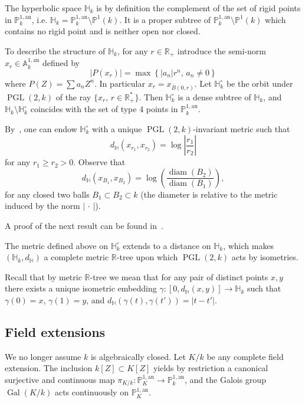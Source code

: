\documentclass[AHL,Unicode,longabstracts]{cedram}
\DeclareMathOperator{\Gal}{Gal}
\DeclareMathOperator{\diam}{diam}
\DeclareMathOperator{\PGL}{PGL}
\newcommand{\hh}{\mathbb{H}}
\newcommand{\A}{{\mathbb A}}
\newcommand{\R}{{\mathbb R}}
\newcommand{\an}{\mathrm{an}}
\newcommand{\PP}{\mathbb{P}}
\newcommand{\PGLk}{\PGL(2, k)}
\begin{document}
The hyperbolic space $\hh_k$ is by definition the complement of the set of rigid points in $\PP^{1,\an}_k$, i.e. $\hh_k = \PP^{1,\an}_k \setminus \PP^{1}(k)$. It is a proper subtree of $\PP^{1,\an}_k \setminus \PP^1(k)$ which contains no rigid point and is neither open nor closed.

To describe the structure of $\hh_k$, for any $r\in \R_+$ introduce the semi-norm $x_r\in \A^{1,\an}_k$ defined by
\[
|P(x_r)| = \max \left\{ |a_n| r^n, \, a_n \neq 0 \right\}
\]
where $P(Z) = \sum a_n Z^n$. In particular $x_r = x_{\bar B(0,r)}$. Let $\hh_k^\circ$ be the orbit under $\PGL(2,k)$ of the ray $\{ x_r, \, r\in \R_+^*\}$. Then $\hh_k^\circ$ is a dense subtree of $\hh_k$, and $\hh_k \setminus \hh_k^\circ$ coincides with the set of type 4 points in $\PP^{1,\an}_k$.

By~\cite[Prop.~2.30]{baker-rumely}, one can endow $\hh_k^\circ$ with a unique $\PGL(2,k)$-invariant metric such that
\[
d_{\hh} (x_{r_1}, x_{r_2}) = \log \left|\frac{r_1}{r_2}\right|
\]
for any $r_1\ge r_2 >0$. Observe that
\[
d_{\hh} (x_{B_1}, x_{B_2}) = \log \left(\frac{\diam(B_2)}{\diam(B_1)}\right),
\]
for any closed two balls $B_1 \subset B_2 \subset k$ (the diameter is relative to the metric induced by the norm $|{\,\cdot\,}|$).

A proof of the next result can be found in~\cite[Prop.~2.29]{baker-rumely}.

\begin{lemm}
The metric defined above on $\hh_k^\circ$ extends to a distance on $\hh_k$, which makes $(\hh_k, d_{\hh})$ a complete metric $\R$-tree upon which $\PGLk$ acts by isometries.
\end{lemm}

Recall that by metric $\R$-tree we mean that for any pair of distinct points $x,y$ there exists a unique isometric embedding $\gamma : [0,d_{\hh}(x,y)] \to \hh_k$ such that $\gamma(0) = x$, $\gamma(1) =y$, and $d_{\hh}(\gamma(t), \gamma(t')) = |t -t'|$.

\subsection{Field extensions}\label{subs:field extensions}

We no longer assume $k$ is algebraically closed. Let $K/k$ be any complete field extension. The inclusion $k[Z] \subset K[Z]$ yields by restriction a canonical surjective and continuous map $\pi_{K/k}\colon \PP^{1,\an}_K \to \PP^{1,\an}_k$, and the Galois group $\Gal(K/k)$ acts continuously on $\PP^{1,\an}_K$.
\end{document}
